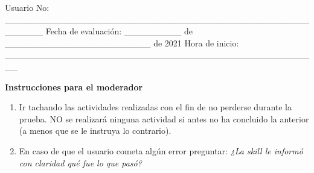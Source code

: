 \begin{tcolorbox}[colback=white!25!white,colframe=blue]
  Usuario No: \_\_\_\_\_\_\_\_\_\_\_\_\_\_\_\_\_\_\_\_\_\_\_\_\_\_\_\_\_\_\_\_\_\_\_\_\_\_\_\_\_\_\_\_\_\_\_\_\_\_\_\_\_\_
  Fecha de evaluación: \_\_\_\_\_\_\_\_\_ de \_\_\_\_\_\_\_\_\_\_\_\_\_\_\_\_\_\_\_\_\_\_\_ de 2021
  Hora de inicio: \_\_\_\_\_\_\_\_\_\_\_\_\_\_\_\_\_\_\_\_\_\_\_\_\_\_\_\_\_\_\_\_\_\_\_\_\_\_\_\_\_\_\_\_\_\_\_\_\_\_

  \textbf{Instrucciones para el moderador}
  \begin{enumerate}
    \item Ir tachando las actividades realizadas con el fin de no perderse durante la prueba. NO se realizará ninguna actividad si antes no ha concluido la anterior (a menos que se le instruya lo contrario).
    \item En caso de que el usuario cometa algún error preguntar:
    \textit{¿La skill le informó con claridad qué fue lo que pasó?}
  \end{enumerate}


\end{tcolorbox}
